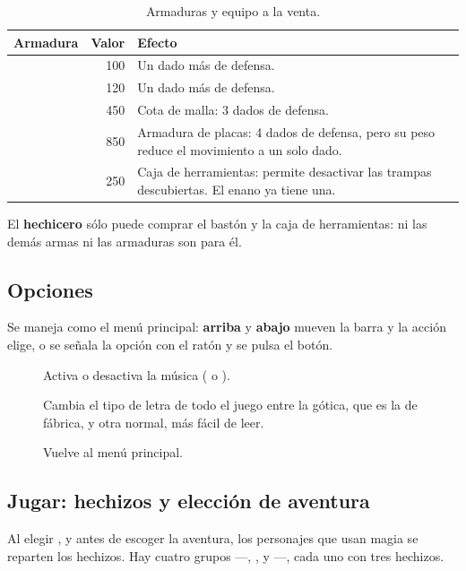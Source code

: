 \begin{table}[H]\centering\small
\begin{tabularx}{\linewidth}{@{}lrL@{}}
\toprule
\textbf{Armadura} & \textbf{Valor} & \textbf{Efecto}\\
\midrule
{}   & 100 & Un dado más de defensa.\\
    & 120 & Un dado más de defensa.\\
    & 450 & Cota de malla: 3 dados de defensa.\\
 & 850 & Armadura de placas: 4 dados de defensa, pero su
                        peso reduce el movimiento a un solo dado.\\
     & 250 & Caja de herramientas: permite desactivar las
                        trampas descubiertas. El enano ya tiene una.\\
\bottomrule
\end{tabularx}
\caption{Armaduras y equipo a la venta.}
\end{table}

El \textbf{hechicero} sólo puede comprar el bastón y la caja de
herramientas: ni las demás armas ni las armaduras son para él.

\subsection{Opciones}


Se maneja como el menú principal: \textbf{arriba} y \textbf{abajo} mueven
la barra y la acción elige, o se señala la opción con el ratón y se pulsa
el botón.

\begin{description}
\item[] Activa o desactiva la música ( o
  ).
\item[] Cambia el tipo de letra de todo el juego entre la
  gótica, que es la de fábrica, y otra normal, más fácil de leer.
\item[] Vuelve al menú principal.
\end{description}

\subsection{Jugar: hechizos y elección de aventura}

Al elegir , y antes de escoger la aventura, los personajes que
usan magia se reparten los hechizos. Hay cuatro grupos ---,
,  y ---, cada uno con tres hechizos.


